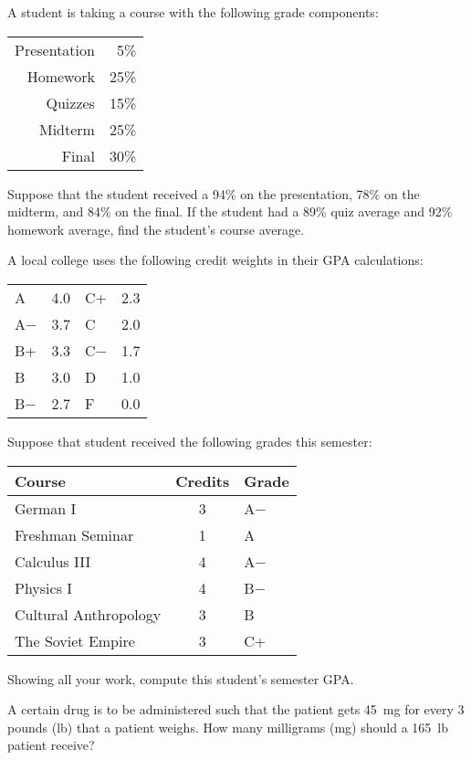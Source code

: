 \documentclass[12pt,letterpaper]{exam}
\begin{document}
\begin{questions}
\newpage
\question[10] A student is taking a course with the following grade components:
	\begin{table}[!ht]
	\centering
	\begin{tabular}{rr}
	Presentation & 5\% \\
	Homework & 25\% \\
	Quizzes & 15\% \\
	Midterm & 25\% \\
	Final & 30\% 
	\end{tabular}
	\end{table} \par
Suppose that the student received a 94\% on the presentation, 78\% on the midterm, and 84\% on the final. If the student had a 89\% quiz average and 92\% homework average, find the student's course average. 



\newpage
\question[10] A local college uses the following credit weights in their GPA calculations:
	\begin{table}[!ht]
	\centering
	\begin{tabular}{lr|lr}
	A & 4.0 & C+ & 2.3 \\
	A$-$ & 3.7 & C & 2.0 \\
	B+ & 3.3 & C$-$ & 1.7 \\
	B & 3.0 & D & 1.0 \\
	B$-$ & 2.7 & F & 0.0
	\end{tabular}
	\end{table} \par
Suppose that student received the following grades this semester:
	\begin{table}[!ht]
	\centering
	\begin{tabular}{lcl}
	Course & Credits & Grade \\ \hline
	German I & 3 & A$-$ \\
	Freshman Seminar & 1 & A \\
	Calculus III & 4 & A$-$ \\
	Physics I & 4 & B$-$ \\
	Cultural Anthropology & 3 & B \\
	The Soviet Empire & 3 & C+
	\end{tabular}
	\end{table} \par
Showing all your work, compute this student's semester GPA. 



\newpage
\question[10] A certain drug is to be administered such that the patient gets 45~mg for every 3 pounds (lb) that a patient weighs. How many milligrams (mg) should a 165~lb patient receive? 




\end{questions}
\end{document}
